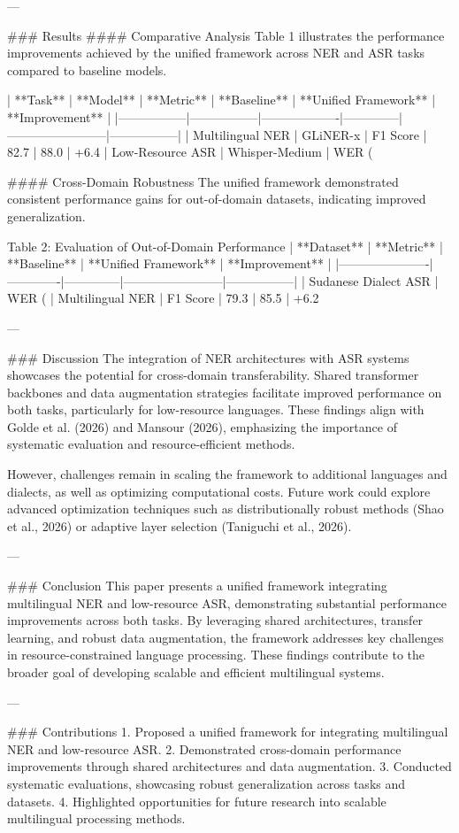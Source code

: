 ---

### Results  
#### Comparative Analysis  
Table 1 illustrates the performance improvements achieved by the unified framework across NER and ASR tasks compared to baseline models.

| **Task**       | **Model**       | **Metric**        | **Baseline** | **Unified Framework** | **Improvement** |
|-----------------|-----------------|-------------------|--------------|------------------------|-----------------|
| Multilingual NER | GLiNER-x        | F1 Score          | 82.7         | 88.0                  | +6.4%
| Low-Resource ASR | Whisper-Medium  | WER (%

#### Cross-Domain Robustness  
The unified framework demonstrated consistent performance gains for out-of-domain datasets, indicating improved generalization.

Table 2: Evaluation of Out-of-Domain Performance  
| **Dataset**         | **Metric**  | **Baseline** | **Unified Framework** | **Improvement** |
|----------------------|-------------|--------------|------------------------|-----------------|
| Sudanese Dialect ASR | WER (%
| Multilingual NER     | F1 Score   | 79.3         | 85.5                  | +6.2%

---

### Discussion  
The integration of NER architectures with ASR systems showcases the potential for cross-domain transferability. Shared transformer backbones and data augmentation strategies facilitate improved performance on both tasks, particularly for low-resource languages. These findings align with Golde et al. (2026) and Mansour (2026), emphasizing the importance of systematic evaluation and resource-efficient methods.

However, challenges remain in scaling the framework to additional languages and dialects, as well as optimizing computational costs. Future work could explore advanced optimization techniques such as distributionally robust methods (Shao et al., 2026) or adaptive layer selection (Taniguchi et al., 2026).

---

### Conclusion  
This paper presents a unified framework integrating multilingual NER and low-resource ASR, demonstrating substantial performance improvements across both tasks. By leveraging shared architectures, transfer learning, and robust data augmentation, the framework addresses key challenges in resource-constrained language processing. These findings contribute to the broader goal of developing scalable and efficient multilingual systems.

---

### Contributions  
1. Proposed a unified framework for integrating multilingual NER and low-resource ASR.  
2. Demonstrated cross-domain performance improvements through shared architectures and data augmentation.  
3. Conducted systematic evaluations, showcasing robust generalization across tasks and datasets.  
4. Highlighted opportunities for future research into scalable multilingual processing methods.